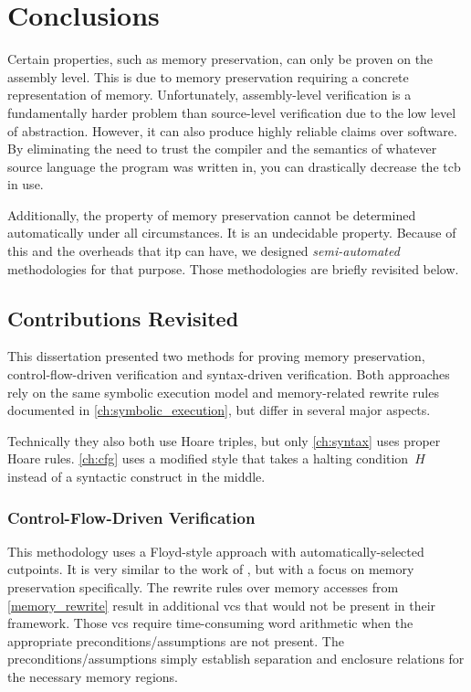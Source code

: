 \chapter{Conclusions}\label{ch:conclusions}
Certain properties, such as memory preservation, can only be proven on the assembly level.
This is due to memory preservation requiring a concrete representation of memory.
Unfortunately, assembly-level verification is a fundamentally harder problem
than source-level verification due to the low level of abstraction.
However, it can also produce highly reliable claims over software.
By eliminating the need to trust the compiler
and the semantics of whatever source language the program was written in,
you can drastically decrease the \ac{tcb} in use.

Additionally, the property of memory preservation cannot be determined automatically
under all circumstances. It is an undecidable property.
Because of this and the overheads that \ac{itp} can have,
we designed \emph{semi-automated} methodologies for that purpose.
Those methodologies are briefly revisited below.

\section{Contributions Revisited}
This dissertation presented two methods for proving memory preservation,
control-flow-driven verification and syntax-driven verification.
Both approaches rely on the same symbolic execution model and memory-related rewrite rules
documented in \cref{ch:symbolic_execution}, but differ in several major aspects.

Technically they also both use Hoare triples, but only \cref{ch:syntax}
uses proper Hoare rules. \cref{ch:cfg} uses a modified style
that takes a halting condition~$H$ instead of a syntactic construct in the middle.

\subsection{Control-Flow-Driven Verification}
This methodology uses a Floyd-style approach \autocite{floyd1967assigning}
with automatically-selected cutpoints.
It is very similar to the work of \textcite{matthews2006verification},
but with a focus on memory preservation specifically.
The rewrite rules over memory accesses from \cref{memory_rewrite}
result in additional \acp{vc} that would not be present in their framework.
Those \acp{vc} require time-consuming word arithmetic
when the appropriate preconditions/assumptions are not present.
The preconditions/assumptions simply establish separation and enclosure relations
for the necessary memory regions.

